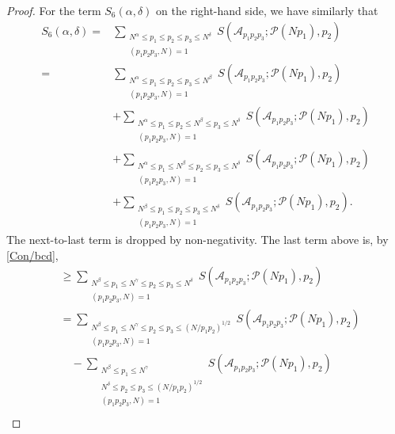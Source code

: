 \documentclass[10pt,a4paper]{amsart}
\def \N {{\mathbb N}}
\def\ge{\geqslant}
\def\le{\leqslant}
\begin{document}
\begin{proof}
For the term $S_6(\alpha, \delta)$ on the right-hand side, 
we have similarly that 
		\begin{equation}\label{GoldW10}
		\begin{split}
		S_6(\alpha, \delta) =& \sum_{\substack{N^\alpha \le p_1 \le p_2 \le p_3 \le N^{\delta} \\ (p_1 p_2 p_3, N) = 1}} S(\mathscr{A}_{p_1 p_2 p_3}; \mathscr{P}(N p_1), p_2)\\
		=&\sum_{\substack{N^\alpha \le p_1 \le p_2 \le p_3\le N^\beta \\ (p_1 p_2 p_3, N) = 1}}  S(\mathscr{A}_{p_1 p_2 p_3}; \mathscr{P}(Np_1), p_2)\\
		&+\sum_{\substack{N^\alpha \le p_1 \le p_2\le N^\beta \le p_3\le N^{\delta} \\ (p_1 p_2 p_3, N) = 1}}  S(\mathscr{A}_{p_1 p_2 p_3}; \mathscr{P}(Np_1), p_2)\\
		&+\sum_{\substack{N^\alpha \le p_1 \le N^\beta\le p_2\le p_3\le N^{\delta} \\ (p_1 p_2 p_3, N) = 1}}  S(\mathscr{A}_{p_1 p_2 p_3}; \mathscr{P}(Np_1), p_2)\\
		&+\sum_{\substack{N^\beta \le p_1 \le p_2\le p_3\le N^{\delta} \\ (p_1 p_2 p_3, N) = 1}}  S(\mathscr{A}_{p_1 p_2 p_3}; \mathscr{P}(Np_1), p_2). 
\end{split}
\end{equation}
The next-to-last term is dropped by non-negativity. The last term above is, by \eqref{Con/bcd}, 
\begin{equation}\label{GoldW11}
		\begin{split}
		& \ge \sum_{\substack{N^\beta \le p_1\le N^\gamma \le p_2\le p_3\le N^{\delta} \\ (p_1 p_2 p_3, N) = 1}}  S(\mathscr{A}_{p_1 p_2 p_3}; \mathscr{P}(Np_1), p_2)\\
		& = \sum_{\substack{N^\beta \le p_1\le N^\gamma \le p_2\le p_3\le (N/p_1p_2)^{1/2} \\ (p_1 p_2 p_3, N) = 1}}  S(\mathscr{A}_{p_1 p_2 p_3}; \mathscr{P}(Np_1), p_2)\\
		 &\quad  -\sum_{\substack{N^\beta \le p_1\le N^{\gamma}\\N^\delta \le p_2\le p_3\le (N/p_1p_2)^{1/2} \\ (p_1 p_2 p_3, N) = 1}}  S(\mathscr{A}_{p_1 p_2 p_3}; \mathscr{P}(Np_1), p_2)\\

\end{split}
\end{equation}
\end{proof}
\end{document}
